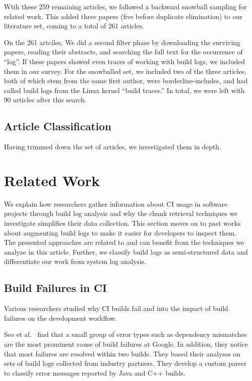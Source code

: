Wtih these 259 remaining articles, we followed a backward snowball
sampling for related work. This added three papers (five before
duplicate elimination) to our literature set, coming to a total of 261
articles. 

On the 261 artciles, We did a second filter phase by downloading the
surviving papers, reading their abstracts, and searching the full text
for the occurrence of ``log''. If these papers showed even traces of
working with build logs, we included them in our survey. For the
snowballed set, we included two of the three articles, both of which
stem from the same first author, were borderline-includes, and had
called build logs from the Linux kernel ``build traces.'' In total, we
were left with 90 articles after this search.

\subsection{Article Classification}
Having trimmed down the set of articles, we investigated them in depth.



\section{Related Work}
\label{sec:rw}
We explain how researchers gather information about CI usage in software projects
through build log analysis and why the chunk retrieval techniques we investigate
simplifies their data collection.
This section moves on to past works about augmenting build logs to make it easier
for developers to inspect them.
The presented approaches are related to and can benefit from the techniques we
analyze in this article.
Further, we classify build logs as semi-structured data and differentiate our
work from system log analysis.

\subsection{Build Failures in CI}
Various researchers studied why CI builds fail and into the impact of build failures on the development workflow.

Seo et al.~\cite{seo2014programmers} find that a small group of error types such as dependency mismatches are the most prominent cause of build failures at Google.
In addition, they notice that most failures are resolved within two builds.
They based their analyses on sets of build logs collected from industry partners.
They develop a custom parser to classify error messages reported by Java and C++ builds.

